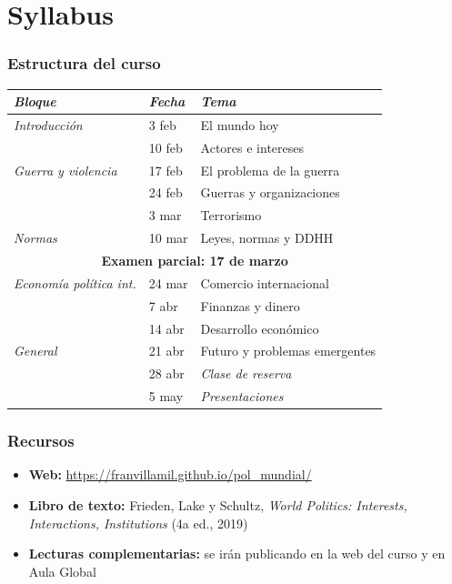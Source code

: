 \section{Syllabus}

\begin{frame}
\frametitle{Estructura del curso}
\centering

\footnotesize
\begin{tabular}{lll}
\textit{\scriptsize Bloque} & \textit{\scriptsize Fecha} & \textit{\scriptsize Tema} \\
\hline
\textit{Introducción} & 3 feb & El mundo hoy \\
  & 10 feb & Actores e intereses \\
\hline
\textit{Guerra y violencia} & 17 feb & El problema de la guerra \\
  & 24 feb & Guerras y organizaciones \\
  & 3 mar & Terrorismo \\
\hline
\textit{Normas} & 10 mar & Leyes, normas y DDHH \\
\hline
\multicolumn{3}{c}{\textbf{Examen parcial: 17 de marzo}} \\
\hline
\textit{Economía política int.} & 24 mar & Comercio internacional \\
  & 7 abr & Finanzas y dinero \\
  & 14 abr & Desarrollo económico \\
\hline
\textit{General} & 21 abr & Futuro y problemas emergentes \\
  & 28 abr & \textit{Clase de reserva} \\
  & 5 may & \textit{Presentaciones} \\
\end{tabular}

\end{frame}

\begin{frame}
\frametitle{Recursos}
\centering

\begin{itemize}
  \item \textbf{Web:} \url{https://franvillamil.github.io/pol_mundial/}
  \item \textbf{Libro de texto:} Frieden, Lake y Schultz, \textit{World Politics: Interests, Interactions, Institutions} (4a ed., 2019)
  \item \textbf{Lecturas complementarias:} se irán publicando en la web del curso y en Aula Global
\end{itemize}

\end{frame}

